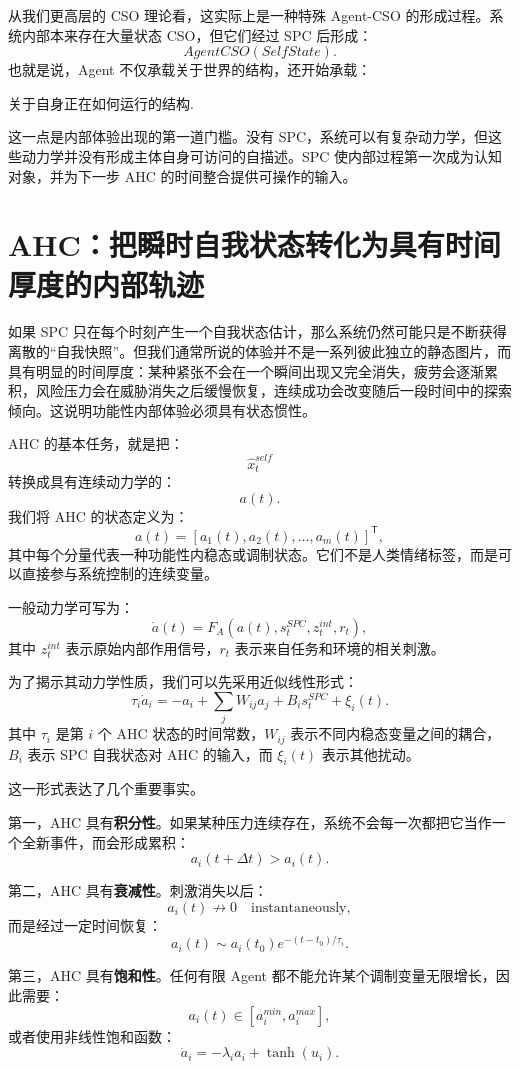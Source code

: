 从我们更高层的 CSO 理论看，这实际上是一种特殊 Agent-CSO 的形成过程。系统内部本来存在大量状态 CSO，但它们经过 SPC 后形成：
\[
AgentCSO(SelfState).
\]
也就是说，Agent 不仅承载关于世界的结构，还开始承载：
\begin{statementbox}
关于自身正在如何运行的结构.
\end{statementbox}

这一点是内部体验出现的第一道门槛。没有 SPC，系统可以有复杂动力学，但这些动力学并没有形成主体自身可访问的自描述。SPC 使内部过程第一次成为认知对象，并为下一步 AHC 的时间整合提供可操作的输入。

\section{AHC：把瞬时自我状态转化为具有时间厚度的内部轨迹}

如果 SPC 只在每个时刻产生一个自我状态估计，那么系统仍然可能只是不断获得离散的``自我快照''。但我们通常所说的体验并不是一系列彼此独立的静态图片，而具有明显的时间厚度：某种紧张不会在一个瞬间出现又完全消失，疲劳会逐渐累积，风险压力会在威胁消失之后缓慢恢复，连续成功会改变随后一段时间中的探索倾向。这说明功能性内部体验必须具有状态惯性。

AHC 的基本任务，就是把：
\[
\hat x_t^{self}
\]
转换成具有连续动力学的：
\[
a(t).
\]
我们将 AHC 的状态定义为：
\[
\boxed{
a(t)
=
[a_1(t),a_2(t),\ldots,a_m(t)]^{\mathsf T},
}
\]
其中每个分量代表一种功能性内稳态或调制状态。它们不是人类情绪标签，而是可以直接参与系统控制的连续变量。

一般动力学可写为：
\[
\boxed{
\dot a(t)
=
F_A
\left(
a(t),
s_t^{SPC},
z_t^{int},
r_t
\right),
}
\]
其中 $z_t^{int}$ 表示原始内部作用信号，$r_t$ 表示来自任务和环境的相关刺激。

为了揭示其动力学性质，我们可以先采用近似线性形式：
\[
\tau_i\dot a_i
=
-a_i
+
\sum_j W_{ij}a_j
+
B_i s_t^{SPC}
+
\xi_i(t).
\]
其中 $\tau_i$ 是第 $i$ 个 AHC 状态的时间常数，$W_{ij}$ 表示不同内稳态变量之间的耦合，$B_i$ 表示 SPC 自我状态对 AHC 的输入，而 $\xi_i(t)$ 表示其他扰动。

这一形式表达了几个重要事实。

第一，AHC 具有\textbf{积分性}。如果某种压力连续存在，系统不会每一次都把它当作一个全新事件，而会形成累积：
\[
a_i(t+\Delta t)
>
a_i(t).
\]

第二，AHC 具有\textbf{衰减性}。刺激消失以后：
\[
a_i(t)
\not\rightarrow
0
\quad
\text{instantaneously},
\]
而是经过一定时间恢复：
\[
a_i(t)
\sim
a_i(t_0)e^{-(t-t_0)/\tau_i}.
\]

第三，AHC 具有\textbf{饱和性}。任何有限 Agent 都不能允许某个调制变量无限增长，因此需要：
\[
a_i(t)\in[a_i^{min},a_i^{max}],
\]
或者使用非线性饱和函数：
\[
\dot a_i
=
-\lambda_i a_i
+
\tanh
\left(
u_i
\right).
\]

